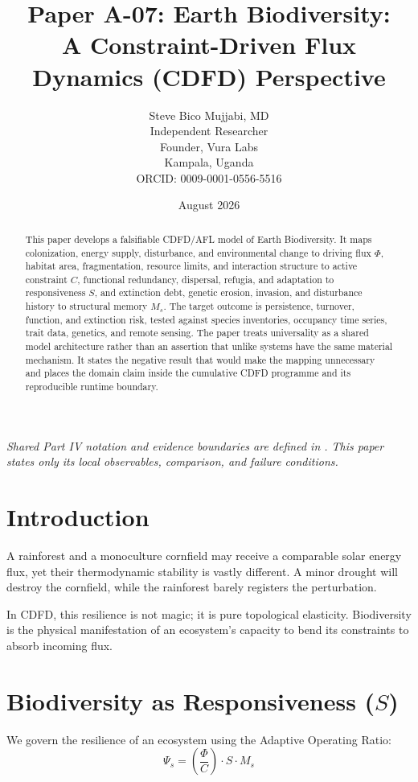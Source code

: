 \documentclass[11pt,a4paper]{article}
\title{\textbf{Paper A-07: Earth Biodiversity:\\ A Constraint-Driven Flux Dynamics (CDFD) Perspective}}
\author{Steve Bico Mujjabi, MD\\
\small Independent Researcher\\
\small Founder, Vura Labs\\
\small Kampala, Uganda\\
\small ORCID: 0009-0001-0556-5516}
\date{August 2026}
\begin{document}
\maketitle

\noindent\textit{Shared Part IV notation and evidence boundaries are defined in . This paper states only its local observables, comparison, and failure conditions.}


\begin{abstract}
This paper develops a falsifiable CDFD/AFL model of Earth Biodiversity. It maps colonization, energy supply, disturbance, and environmental change to driving flux $\Phi$, habitat area, fragmentation, resource limits, and interaction structure to active constraint $C$, functional redundancy, dispersal, refugia, and adaptation to responsiveness $S$, and extinction debt, genetic erosion, invasion, and disturbance history to structural memory $M_s$. The target outcome is persistence, turnover, function, and extinction risk, tested against species inventories, occupancy time series, trait data, genetics, and remote sensing. The paper treats universality as a shared model architecture rather than an assertion that unlike systems have the same material mechanism. It states the negative result that would make the mapping unnecessary and places the domain claim inside the cumulative CDFD programme and its reproducible runtime boundary.
\end{abstract}

\section{Introduction}

A rainforest and a monoculture cornfield may receive a comparable solar energy flux, yet their thermodynamic stability is vastly different. A minor drought will destroy the cornfield, while the rainforest barely registers the perturbation.

In CDFD, this resilience is not magic; it is pure topological elasticity. Biodiversity is the physical manifestation of an ecosystem's capacity to bend its constraints to absorb incoming flux.

\section{Biodiversity as Responsiveness ($S$)}
We govern the resilience of an ecosystem using the Adaptive Operating Ratio:
\begin{equation}
    \Psi_s = \left( \frac{\Phi}{C} \right) \cdot S \cdot M_s
\end{equation}
\end{document}
